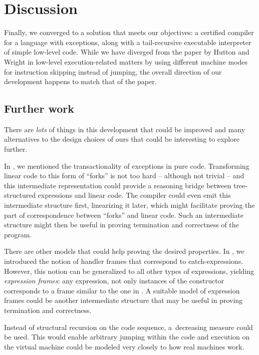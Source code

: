 \chapter{Discussion}

Finally, we converged to a solution that meets our objectives: a certified compiler for a
language with exceptions, along with a tail-recursive executable interpreter of simple
low-level code. While we have diverged from the
paper by Hutton and Wright \cite{gmh:exceptions} in low-level execution-related matters
by using different machine modes for instruction skipping instead of jumping, the overall
direction of our development happens to match that of the paper.

\section{Further work}

There are \emph{lots} of things in this development that could be improved and many alternatives
to the design choices of ours that could be interesting to explore further.

In , we mentioned the transactionality of exceptions in pure code. Transforming
linear code to this form of ``forks'' is not too hard -- although not trivial -- and this
intermediate representation could provide a reasoning bridge between tree-structured expressions
and linear code. The compiler could even emit this intermediate structure first,
linearizing it later, which might facilitate proving the part of correspondence between ``forks''
and linear code. Such an intermediate structure might then be useful in proving termination and
correctness of the program.

There are other models that could help proving the desired properties. In
, we introduced the notion of handler frames that correspond to
catch-expressions. However, this notion can be generalized to all other types of expressions,
yielding \emph{expression frames}: any expression, not only instances of the constructor
 corresponds to a frame similar to the one in .
A suitable model of expression frames could be another intermediate structure that may
be useful in proving termination and correctness.

Instead of structural recursion on the code sequence, a~decreasing measure
could be used. This would enable arbitrary jumping within the code and execution on
the virtual machine could be modeled very closely to how real machines work.

